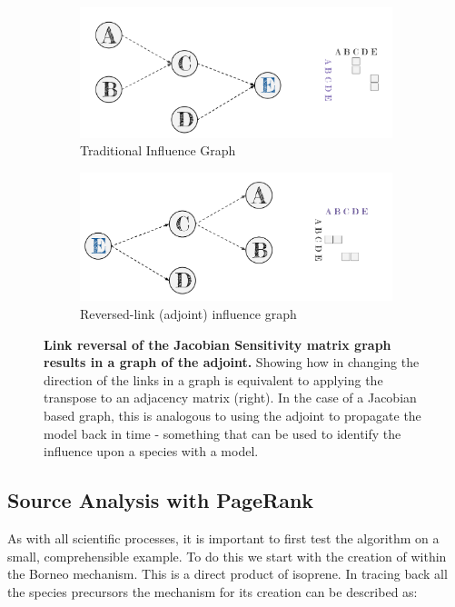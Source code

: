 \begin{figure}[H]
    \centering
\begin{subfigure}{.9\textwidth}
  \centering
  \includegraphics[width=\textwidth]{figures_c3/traditional.pdf}
  \caption{Traditional Influence Graph} 
\end{subfigure}

\begin{subfigure}{.9\textwidth }
  \centering
  \includegraphics[width=\textwidth]{figures_c3/adjoint.pdf}
  \caption{Reversed-link (adjoint) influence graph}
\end{subfigure}

\caption{\textbf{Link reversal of the Jacobian Sensitivity matrix graph results in a graph of the adjoint.} Showing how in changing the direction of the links in a graph is equivalent to applying the transpose to an adjacency matrix (right). In the case of a Jacobian based graph, this is analogous to using the adjoint to propagate the model back in time - something that can be used to identify the influence upon a species with a model.}
  \label{fig:prgraphs}
\end{figure}




\subsection{Source Analysis with PageRank}
As with all scientific processes, it is important to first test the algorithm on a small, comprehensible example. To do this we start with the creation of  within the Borneo mechanism. This is a direct product of isoprene. In tracing back all the species precursors the mechanism for its creation can be described as: 

